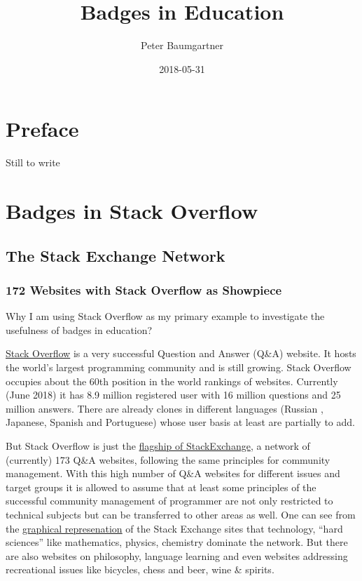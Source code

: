 \documentclass[]{book}
\title{Badges in Education}
\author{Peter Baumgartner}
\date{2018-05-31}
\theoremstyle{definition}
\theoremstyle{definition}
\theoremstyle{definition}
\theoremstyle{remark}
\begin{document}
\maketitle

{
\setcounter{tocdepth}{1}
\tableofcontents
}
\chapter{Preface}\label{preface}

Still to write

\chapter{Badges in Stack Overflow}\label{badges-in-stack-overflow}

\section{The Stack Exchange Network}\label{the-stack-exchange-network}

\subsection{172 Websites with Stack Overflow as
Showpiece}\label{websites-with-stack-overflow-as-showpiece}

Why I am using Stack Overflow as my primary example to investigate the
usefulness of badges in education?

\href{https://stackoverflow.com/}{Stack Overflow} is a very successful
Question and Answer (Q\&A) website. It hosts the world's largest
programming community and is still growing. Stack Overflow occupies
about the 60th position in the world rankings of websites. Currently
(June 2018) it has 8.9 million registered user with 16 million questions
and 25 million answers. There are already clones in different languages
(Russian , Japanese, Spanish and Portuguese) whose user basis at least
are partially to add.

But Stack Overflow is just the
\href{https://stackexchange.com/sites\#traffic}{flagship of
StackExchange}, a network of (currently) 173 Q\&A websites, following
the same principles for community management. With this high number of
Q\&A websites for different issues and target groups it is allowed to
assume that at least some principles of the successful community
management of programmer are not only restricted to technical subjects
but can be transferred to other areas as well. One can see from the
\href{https://stackexchange.com/sites?view=grid\#}{graphical
represenation} of the Stack Exchange sites that technology, ``hard
sciences'' like mathematics, physics, chemistry dominate the network.
But there are also websites on philosophy, language learning and even
websites addressing recreational issues like bicycles, chess and beer,
wine \& spirits.
\end{document}
